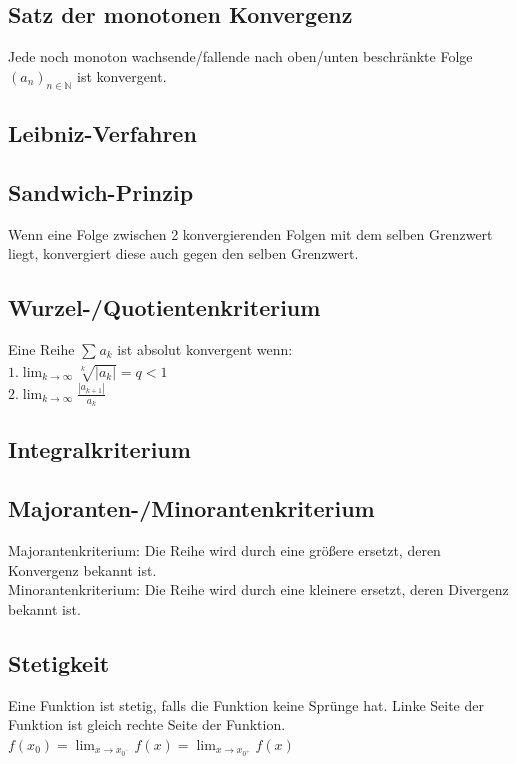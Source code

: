 \documentclass[12pt,a4paper]{article}
\begin{document}
	\subsection{Satz der monotonen Konvergenz}
		Jede noch monoton wachsende/fallende nach oben/unten beschränkte Folge $(a_n)_{n \in \mathbb{N}}$ ist konvergent.\\

	\subsection{Leibniz-Verfahren}

	\subsection{Sandwich-Prinzip}
		Wenn eine Folge zwischen 2 konvergierenden Folgen mit dem selben Grenzwert liegt, konvergiert diese auch gegen den selben Grenzwert.

	\subsection{Wurzel-/Quotientenkriterium}
		Eine Reihe $ \sum_{}^{} a_k  $ ist absolut konvergent wenn:\\
		$1. \lim_{k \to \infty} \sqrt[k]{|a_k|}  = q < 1$\\
		$2. \lim_{k \to \infty} \frac{|a_{k+1}|}{a_k} $
		
	\subsection{Integralkriterium}
		

	\subsection{Majoranten-/Minorantenkriterium}
		Majorantenkriterium: Die Reihe wird durch eine größere ersetzt, deren Konvergenz bekannt ist.\\
		Minorantenkriterium: Die Reihe wird durch eine kleinere ersetzt, deren Divergenz bekannt ist.

	\subsection{Stetigkeit}
		Eine Funktion ist stetig, falls die Funktion keine Sprünge hat. 
		Linke Seite der Funktion ist gleich rechte Seite der Funktion.\\
		$f(x_0) = \lim_{x \to x_{0^-}} f(x) = \lim_{x \to x_{0^+}} f(x) $ \\
\end{document}
